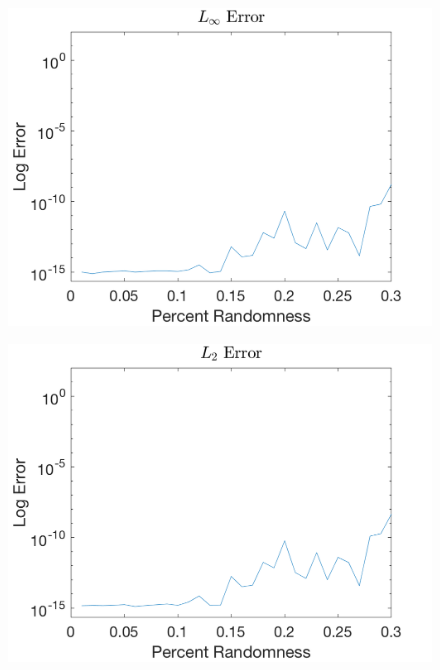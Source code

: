 \documentclass{article}
\begin{document}
\begin{figure}[H]
  \centering
  \begin{minipage}{.6\textwidth}
    \centering
    \includegraphics[width=\linewidth]{maxRandErr.png}
    \label{fig:max3}
  \end{minipage}%
  \begin{minipage}{.6\textwidth}
    \centering
    \includegraphics[width=\linewidth]{squareRandErr.png}
    \label{fig:square3}
  \end{minipage}%
\end{figure}
\end{document}
